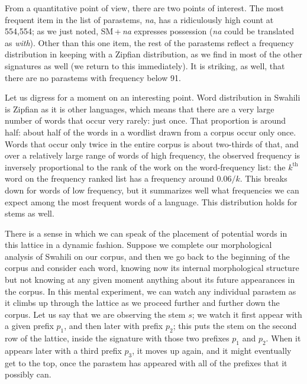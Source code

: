 \documentclass[output=paper,colorlinks,citecolor=brown]{langscibook}
\begin{document}
From a quantitative point of view, there are two points of interest. The most frequent item in the list of parastems, \textit{na}, has a ridiculously high count at 554,554; as we just noted, {SM}\,+\,\textit{na} expresses possession (\textit{na} could be translated as \textit{with}). Other than this one item, the rest of the parastems reflect a frequency distribution in keeping with a Zipfian distribution, as we find in most of the other signatures as well (we return to this immediately). It is striking, as well, that there are no parastems with frequency below 91. 

Let us digress for a moment on an interesting point. Word distribution in Swahili is Zipfian as it is other languages, which means that there are a very large number of words that occur very rarely: just once. That proportion is around half: about half of the words in a wordlist drawn from a corpus occur only once. Words that occur only twice in the entire corpus is about two-thirds of that, and over a relatively large range of words of high frequency, the observed frequency is inversely proportional to the rank of the work on the word-frequency list: the $k^{\text{th}}$ word on the frequency ranked list has a frequency around $0.06/k$. This breaks down for words of low frequency, but it summarizes well what frequencies we can expect among the most frequent words of a language. This distribution holds for stems as well. 

There is a sense in which we can speak of the placement of potential words in this lattice in a dynamic fashion. Suppose we complete our morphological analysis of Swahili on our corpus, and then we go back to the beginning of the corpus and consider each word, knowing now its internal morphological structure but not knowing at any given moment anything about its future appearances in the corpus. In this mental experiment, we can watch any individual parastem as it climbs up through the lattice as we proceed further and further down the corpus. Let us say that we are observing the stem $s$; we watch it first appear with a given prefix $p_1$, and then later with prefix $p_2$; this puts the stem on the second row of the lattice, inside the signature with those two prefixes $p_1$ and $p_2$. When it appears later with a third prefix $p_3$, it moves up again, and it might eventually get to the top, once the parastem has appeared with all of the prefixes that it possibly can. 
\end{document}
